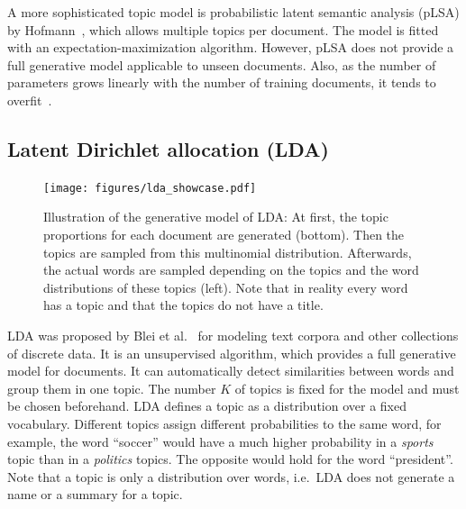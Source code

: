 \documentclass[
        a4paper,
        titlepage,
        twoside,
        parskip
        ]{scrbook}
\theoremstyle{break}
\begin{document}
A more sophisticated topic model is probabilistic latent semantic analysis (pLSA) by Hofmann~\cite{Hofmann1999}, which allows multiple topics per document.
The model is fitted with an expectation-maximization algorithm.
However, pLSA does not provide a full generative model applicable to unseen documents.
Also, as the number of parameters grows linearly with the number of training documents, it tends to overfit~\cite{Blei2003}.

\subsection{Latent Dirichlet allocation (LDA)}

\begin{figure}
       \centering
       \texttt{[image: figures/lda\_showcase.pdf]}
       \caption{Illustration of the generative model of LDA: At first, the topic proportions for each document are generated (bottom).
       Then the topics are sampled from this multinomial distribution.
       Afterwards, the actual words are sampled depending on the topics and the word distributions of these topics (left).
       Note that in reality every word has a topic and that the topics do not have a title.}
       \label{fig:lda_showcase}
\end{figure}

LDA was proposed by Blei et al.~\cite{Blei2003} for modeling text corpora and other collections of discrete data.
It is an unsupervised algorithm, which provides a full generative model for documents.
It can automatically detect similarities between words and group them in one topic.
The number $K$ of topics is fixed for the model and must be chosen beforehand.
LDA defines a topic as a distribution over a fixed vocabulary.
Different topics assign different probabilities to the same word, for example, the word ``soccer'' would have a much higher probability in a \emph{sports} topic than in a \emph{politics} topics.
The opposite would hold for the word ``president''.
Note that a topic is only a distribution over words, i.e.\ LDA does not generate a name or a summary for a topic.
\end{document}
